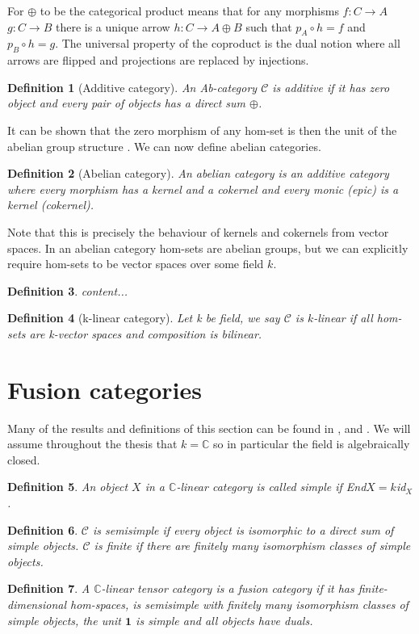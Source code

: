 \documentclass{article}
\newtheorem{definition}{Definition}
\begin{document}
	For $\oplus$ to be the categorical product means that for any morphisms $f:C \rightarrow A$ $g: C \rightarrow B$ there is a unique arrow $h: C \rightarrow A \oplus B$ such that $p_A\circ h = f$ and $p_B \circ h =g$. The universal property of the coproduct is the dual notion where all arrows are flipped and projections are replaced by injections.
	\begin{definition}[Additive category]
		An Ab-category $\mathcal{C}$ is additive if it has zero object and every pair of objects has a direct sum $\oplus$.
	\end{definition}
	It can be shown that the zero morphism of any hom-set is then the unit of the abelian group structure \cite{Vicary12}. We can now define abelian categories.
	\begin{definition}[Abelian category]
		An abelian category is an additive category where every morphism has a kernel and a cokernel and every monic (epic) is a kernel (cokernel).
	\end{definition} 
	Note that this is precisely the behaviour of kernels and cokernels from vector spaces. In an abelian category hom-sets are abelian groups, but we can explicitly require hom-sets to be vector spaces over some field $k$.
	\begin{definition}
		content...
	\end{definition}
	\begin{definition}[k-linear category]
	Let k be field, we say $\mathcal{C}$ is $k$-linear if all hom-sets are k-vector spaces and composition is bilinear.
	\end{definition}
	
	
	\section{Fusion categories}
	Many of the results and definitions  of this section can be found in \cite{Mueger08}, \cite{Bartlett15} and \cite{Freyd66}.
	We will assume throughout the thesis that $k=\mathbb{C}$ so in particular the field is algebraically closed. 
	\begin{definition}
		An object $X$ in a $\mathbb{C}$-linear category is called simple if End$X=k$id$_X$.
	\end{definition}
	\begin{definition}
		$\mathcal{C}$ is semisimple if every object is isomorphic to a direct sum of simple objects. $\mathcal{C}$ is finite if there are finitely many isomorphism classes of simple objects.
	\end{definition}
	\begin{definition}
		A $\mathbb{C}$-linear tensor category is a fusion category if it has finite-dimensional hom-spaces, is semisimple with finitely many isomorphism classes of simple objects, the unit $\mathbf{1}$ is simple  and all objects have duals.
	\end{definition}
	
\end{document}
